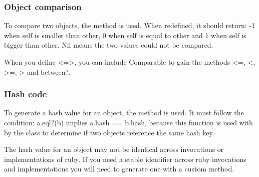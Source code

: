 \documentclass{KodeBook}
\begin{document}


\subsubsection{Object comparison}

To compare two objects, the method \keyword{<=>} is used. 
When redefined, it should return: -1 when self is smaller than other, 0 when self is equal to other and 1 when self is bigger than other. Nil means the two values could not be compared.

When you define <=>, you can include Comparable to gain the methods <=, <, >=, > and between?.



\subsubsection{Hash code}

To generate a hash value for an object, the method  is used. 
It must follow the condition: a.eql?(b) implies a.hash == b.hash, because this function is used with  by the class  to determine if two objects reference the same hash key.


The hash value for an object may not be identical across invocations or implementations of ruby. 
If you need a stable identifier across ruby invocations and implementations you will need to generate one with a custom method.



\ifx\wholebook\relax\else
% 
% 
	
\end{document}
